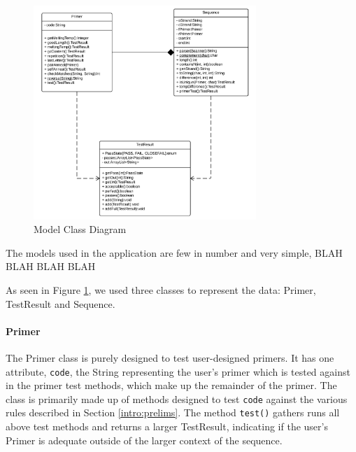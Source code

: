 
\begin{figure}[h]
  \begin{center}
    \includegraphics[width=0.75\textwidth]{./images/currentBuild/modelClassDiagram.png}
    \caption{
      \label{fig:currentBuild:model}
      Model Class Diagram 
    }
  \end{center}
\end{figure}

The models used in the application are few in number and very simple, BLAH BLAH BLAH BLAH

As seen in Figure \ref{fig:currentBuild:model}, we used three classes to represent the data:
Primer, TestResult and Sequence.

\paragraph{Primer}
The Primer class is purely designed to test user-designed primers. It has 
one attribute, \texttt{code}, the String representing the user's primer
which is tested against in the primer test methods, which make up the 
remainder of the primer. The class is primarily made up of methods 
designed to test \texttt{code} against the various rules described in Section 
\ref{intro:prelims}. The method \texttt{test()} gathers runs all above test 
methods and returns a larger TestResult, indicating if the user's Primer 
is adequate outside of the larger context of the sequence.

